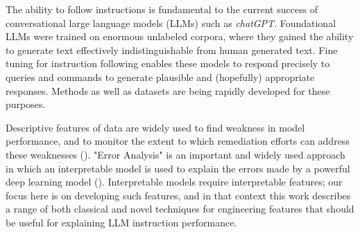 
The ability to follow instructions is fundamental to the current success of conversational large language models (LLMs) such as {\em chatGPT}. Foundational LLMs were trained on enormous unlabeled corpora, where they gained the ability to generate text effectively indistinguishable from human generated text. Fine tuning for instruction following enables these models to respond precisely to queries and commands to generate plausible and (hopefully) appropriate responses. 
Methods as well as datasets are being rapidly developed for these purposes.

Descriptive features of data are widely used to find weakness in model performance, and to monitor the extent to which remediation efforts can address these weaknesses (\cite{nushi2018accountable}). "Error Analysis" is an important and widely used approach in which an interpretable model is used to explain the errors made by a powerful deep learning model (\cite{singla2021understanding}). Interpretable models require interpretable features; our focus here is on developing such features, and in that context this work describes a range of both classical and novel techniques for engineering features that should be useful for explaining LLM instruction performance. 




